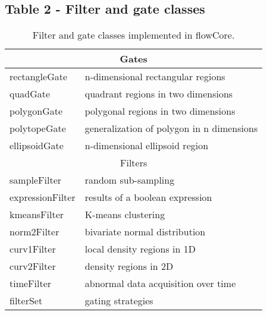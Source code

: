 \documentclass[10pt]{bmc_article}
\newcommand{\Rpackage}[1]{{\textsf{#1}}}
\newenvironment{bmcformat}{\begin{raggedright}\baselineskip20pt\sloppy\setboolean{publ}{false}}{\end{raggedright}\baselineskip20pt\sloppy}
\begin{document}
\begin{bmcformat}
  \subsection*{Table 2 - Filter and gate classes}
  \begin{table}[ht]
    \caption{\label{table2} Filter and gate classes implemented in
      \Rpackage{flowCore}.} 
    \begin{center}
      \begin{tabular}{|l|l|}
        \hline
        \multicolumn{2}{|c|}{Gates} \\
        \hline
        rectangleGate & n-dimensional rectangular regions \\
        quadGate & quadrant regions in two dimensions \\
        polygonGate & polygonal regions in two dimensions \\
        polytopeGate & generalization of polygon in n dimensions \\
        ellipsoidGate & n-dimensional ellipsoid region \\
        \hline
        \multicolumn{2}{|c|}{Filters} \\
        \hline
        sampleFilter & random sub-sampling\\
        expressionFilter & results of a boolean expression \\
        kmeansFilter & K-means clustering \\
        norm2Filter & bivariate normal distribution \\
        curv1Filter & local density regions in 1D \\
        curv2Filter & density regions in 2D \\
        timeFilter & abnormal data acquisition over time \\
        \hline
        filterSet & gating strategies \\
        \hline
      \end{tabular}
    \end{center}
  \end{table}





\end{bmcformat}
\end{document}
